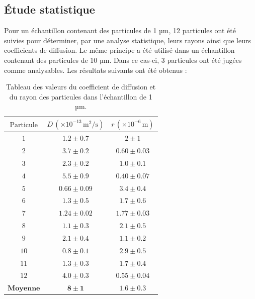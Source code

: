 \documentclass[11pt,letterpaper]{article}
\begin{document}
\subsection{Étude statistique}

Pour un échantillon contenant des particules de 1 µm, 12 particules ont été suivies pour déterminer, par une analyse statistique, leurs rayons ainsi que leurs coefficients de diffusion. 
Le même principe a été utilisé dans un échantillon contenant des particules de 10 µm. Dans ce cas-ci, 3 particules ont été jugées comme analysables. 
Les résultats suivants ont été obtenus :

\begin{table}[H]
  \centering
  \caption{Tableau des valeurs du coefficient de diffusion et du rayon des particules dans l'échantillon de 1 µm.}
  \begin{tabular}{|c|c|c|}
  \hline
  \( \text{Particule} \) &\( D \, (\times 10^{-13} \, \text{m}^2/\text{s}) \) & \( r \, (\times 10^{-6} \, \text{m}) \) \\
  \hline
  \( 1 \) &\( 1.2 \pm 0.7 \) & \( 2 \pm 1 \) \\
  \( 2 \) &\( 3.7 \pm 0.2 \) & \( 0.60 \pm 0.03 \) \\
  \( 3 \) &\( 2.3 \pm 0.2 \) & \( 1.0 \pm 0.1 \) \\
  \( 4 \) &\( 5.5 \pm 0.9 \) & \( 0.40 \pm 0.07 \) \\
  \( 5 \) &\( 0.66 \pm 0.09 \) & \( 3.4 \pm 0.4 \) \\
  \( 6 \) &\( 1.3 \pm 0.5 \) & \( 1.7 \pm 0.6 \) \\
  \( 7 \) &\( 1.24 \pm 0.02 \) & \( 1.77 \pm 0.03 \) \\
  \( 8 \) &\( 1.1 \pm 0.3 \) & \( 2.1 \pm 0.5 \) \\
  \( 9 \) &\( 2.1 \pm 0.4 \) & \( 1.1 \pm 0.2 \) \\
  \( 10 \) &\( 0.8 \pm 0.1 \) & \( 2.9 \pm 0.5 \) \\
  \( 11 \) &\( 1.3 \pm 0.3 \) & \( 1.7 \pm 0.4 \) \\
  \( 12 \) &\( 4.0 \pm 0.3 \) & \( 0.55 \pm 0.04 \) \\
  \hline
  \hline
  \( \textbf{Moyenne} \) & \( \mathbf{8 \pm 1} \) & \( \mathbf{1.6 \pm 0.3} \) \\
  \hline
  \end{tabular}
\end{table}
\end{document}
